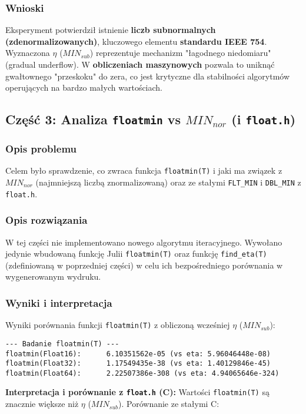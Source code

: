 \documentclass[12pt,a4paper]{article}
\begin{document}
\subsubsection{Wnioski}
Eksperyment potwierdził istnienie \textbf{liczb subnormalnych (zdenormalizowanych)}, kluczowego elementu \textbf{standardu IEEE 754}. Wyznaczona $\eta$ ($MIN_{sub}$) reprezentuje mechanizm "łagodnego niedomiaru" (gradual underflow). W \textbf{obliczeniach maszynowych} pozwala to uniknąć gwałtownego "przeskoku" do zera, co jest krytyczne dla stabilności algorytmów operujących na bardzo małych wartościach.

\subsection{Część 3: Analiza \texttt{floatmin} vs $MIN_{nor}$ (i \texttt{float.h})}

\subsubsection{Opis problemu}
Celem było sprawdzenie, co zwraca funkcja \texttt{floatmin(T)} i jaki ma związek z $MIN_{nor}$ (najmniejszą liczbą znormalizowaną) oraz ze stałymi \texttt{FLT\_MIN} i \texttt{DBL\_MIN} z \texttt{float.h}.

\subsubsection{Opis rozwiązania}
W tej części nie implementowano nowego algorytmu iteracyjnego. Wywołano jedynie wbudowaną funkcję Julii \texttt{floatmin(T)} oraz funkcję \texttt{find\_eta(T)} (zdefiniowaną w poprzedniej części) w celu ich bezpośredniego porównania w wygenerowanym wydruku.

\subsubsection{Wyniki i interpretacja}
Wyniki porównania funkcji \texttt{floatmin(T)} z obliczoną wcześniej $\eta$ ($MIN_{sub}$):
\begin{verbatim}
--- Badanie floatmin(T) ---
floatmin(Float16):      6.10351562e-05 (vs eta: 5.96046448e-08)
floatmin(Float32):      1.17549435e-38 (vs eta: 1.40129846e-45)
floatmin(Float64):      2.22507386e-308 (vs eta: 4.94065646e-324)
\end{verbatim}

\noindent \textbf{Interpretacja i porównanie z \texttt{float.h} (C):}
Wartości \texttt{floatmin(T)} są znacznie większe niż $\eta$ ($MIN_{sub}$). Porównanie ze stałymi C:
\end{document}
